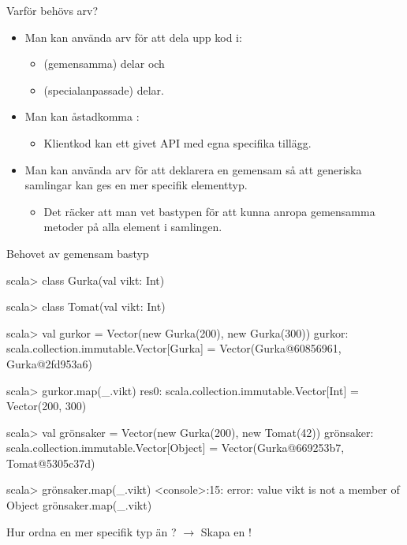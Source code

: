 \begin{Slide}{Varför behövs arv?}
\begin{itemize}
\item Man kan använda arv för att dela upp kod i: 
\begin{itemize}
\item {} (gemensamma) delar och 
\item {} (specialanpassade) delar.
\end{itemize}

\item Man kan åstadkomma : 
\begin{itemize}
\item Klientkod kan   ett givet API med egna specifika tillägg.
\end{itemize}

\item Man kan använda arv för att deklarera en gemensam  så att generiska samlingar kan ges en mer specifik elementtyp. 
\begin{itemize}
\item Det räcker att man vet bastypen för att kunna anropa gemensamma metoder på alla element i samlingen.
\end{itemize}
\end{itemize}
\end{Slide}


\begin{Slide}{Behovet av gemensam bastyp}\SlideFontSmall
\begin{REPL}
scala> class Gurka(val vikt: Int)

scala> class Tomat(val vikt: Int)

scala> val gurkor = Vector(new Gurka(200), new Gurka(300))
gurkor: scala.collection.immutable.Vector[Gurka] = 
  Vector(Gurka@60856961, Gurka@2fd953a6)
  
scala> gurkor.map(_.vikt)
res0: scala.collection.immutable.Vector[Int] = Vector(200, 300)

scala> val grönsaker = Vector(new Gurka(200), new Tomat(42))
grönsaker: scala.collection.immutable.Vector[Object] = 
  Vector(Gurka@669253b7, Tomat@5305c37d)

scala> grönsaker.map(_.vikt)
<console>:15: error: value vikt is not a member of Object
       grönsaker.map(_.vikt)
\end{REPL}
Hur ordna en mer specifik typ än ? \pause$\rightarrow$ Skapa en !
\end{Slide}




